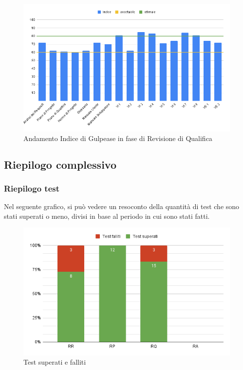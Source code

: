\documentclass[../piano_di_qualifica.tex]{subfiles}
\begin{document}
\begin{figure}[H]
	\centering
	\includegraphics[width=14cm]{img/media_gul_RQ.png}
	\caption{Andamento Indice di Gulpease in fase di Revisione di Qualifica}
\end{figure}

\subsection{Riepilogo complessivo}
\label{sub:riepilogo_complessivo}

\subsubsection{Riepilogo test}
Nel seguente grafico, si può vedere un resoconto della quantità di test che sono stati superati o meno, divisi in base al periodo in cui sono stati fatti.

\begin{figure}[H]
	\centering
	\includegraphics[width=14cm]{src/img/esiti_test.png}
	\caption{Test superati e falliti}
\end{figure}
\end{document}
